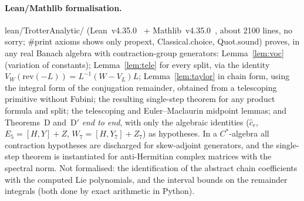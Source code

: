 \documentclass[11pt]{article}
\newcommand{\codeus}{\textunderscore\allowbreak}
\newcommand{\code}[1]{{\ttfamily\let\_\codeus\hyphenchar\font=-1 #1}}
\theoremstyle{plain}
\theoremstyle{definition}
\theoremstyle{remark}
\begin{document}
\paragraph{Lean/Mathlib formalisation.} \code{lean/TrotterAnalytic/} (Lean~v4.35.0~\cite{Lean4} + Mathlib~v4.35.0~\cite{Mathlib2020}, about 2100
lines, no \code{sorry}; \code{\#print axioms} shows only \code{propext}, \code{Classical.choice},
\code{Quot.sound}) proves, in any real Banach algebra with contraction-group generators:
Lemma~\ref{lem:voc} (variation of constants); Lemma~\ref{lem:tele} for every split, via the identity
$V_W(\mathrm{rev}(-L))=L^{-1}(W-V_L)L$; Lemma~\ref{lem:taylor} in chain form, using the integral form of
the conjugation remainder, obtained from a telescoping primitive without Fubini; the resulting
single-step theorem for any product formula and split; the telescoping and Euler--Maclaurin midpoint
lemmas; and Theorems~D and~D$'$ \emph{end to end}, with only the algebraic identities ($\hat c_r$,
$E_5=[H,Y]+Z$, $W_7=[H,Y_7]+Z_7$) as hypotheses. In a $C^*$-algebra all contraction hypotheses are
discharged for skew-adjoint generators, and the single-step theorem is instantiated for anti-Hermitian
complex matrices with the spectral norm. Not formalised: the identification of the abstract chain
coefficients with the computed Lie polynomials, and the interval bounds on the remainder integrals
(both done by exact arithmetic in Python).
\end{document}
